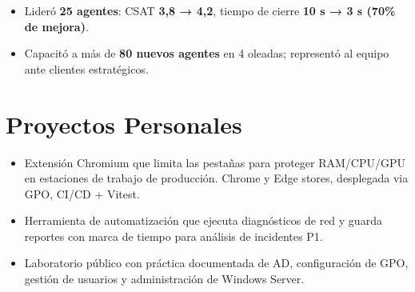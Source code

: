 \documentclass[10pt]{article}
\begin{document}
\vspace{3pt}

\begin{itemize}
  \item Lideró \textbf{25 agentes}: CSAT \textbf{3,8 → 4,2}, tiempo de cierre \textbf{10 s → 3 s
        (70\% de mejora)}.
  \item Capacitó a más de \textbf{80 nuevos agentes} en 4 oleadas; representó al equipo ante
        clientes estratégicos.
\end{itemize}

\section{Proyectos Personales}

\begin{itemize}
  \item Extensión Chromium que limita las pestañas para proteger RAM/CPU/GPU en estaciones de
        trabajo de producción. Chrome y Edge stores, desplegada via GPO, CI/CD + Vitest.
\end{itemize}

\vspace{3pt}

\begin{itemize}
  \item Herramienta de automatización que ejecuta diagnósticos de red y guarda reportes con
        marca de tiempo para análisis de incidentes P1.
\end{itemize}

\vspace{3pt}

\begin{itemize}
  \item Laboratorio público con práctica documentada de AD, configuración de GPO, gestión
        de usuarios y administración de Windows Server.
\end{itemize}

\end{document}
